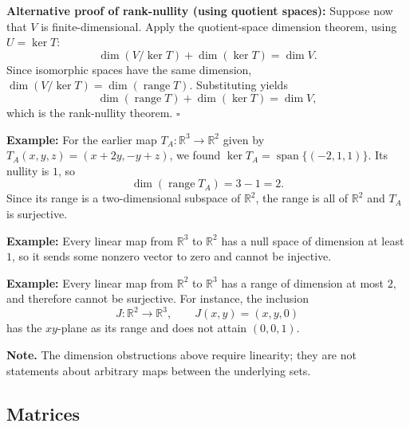 \documentclass[a4paper,11pt,abstract=true]{scrartcl}
\theoremstyle{dotlessP}
\theoremstyle{dotlessS}
\theoremstyle{remark}
\theoremstyle{definition}
\begin{document}
\begin{claim_box}
\textbf{Alternative proof of rank-nullity (using quotient spaces):}
Suppose now that $V$ is finite-dimensional. Apply the quotient-space
dimension theorem, using $U=\ker T$:
\[
\dim(V/\ker T)+\dim(\ker T)=\dim V.
\]
Since isomorphic spaces have the same dimension,
$\dim(V/\ker T)=\dim(\operatorname{range}T)$. Substituting yields
\[
\dim(\operatorname{range}T)+\dim(\ker T)=\dim V,
\]
which is the rank-nullity theorem. \hfill$\square$
\end{claim_box}

\begin{example_box}
\textbf{Example:} For the earlier map
$T_A:\mathbb{R}^3\longrightarrow\mathbb{R}^2$ given by
$T_A(x,y,z)=(x+2y,-y+z)$, we found
$\ker T_A=\operatorname{span}\{(-2,1,1)\}$. Its nullity is $1$, so
\[
\dim(\operatorname{range}T_A)=3-1=2.
\]
Since its range is a two-dimensional subspace of $\mathbb{R}^2$, the
range is all of $\mathbb{R}^2$ and $T_A$ is surjective.
\end{example_box}

\begin{example_box}
\textbf{Example:} Every linear map from $\mathbb{R}^3$ to
$\mathbb{R}^2$ has a null space of dimension at least $1$, so it sends
some nonzero vector to zero and cannot be injective.
\end{example_box}

\begin{example_box}
\textbf{Example:} Every linear map from $\mathbb{R}^2$ to
$\mathbb{R}^3$ has a range of dimension at most $2$, and therefore cannot
be surjective. For instance, the inclusion
\[
J:\mathbb{R}^2\longrightarrow\mathbb{R}^3,
\qquad J(x,y)=(x,y,0)
\]
has the $xy$-plane as its range and does not attain $(0,0,1)$.
\end{example_box}

\begin{remark_box}
\textbf{Note.} The dimension obstructions above require linearity;
they are not statements about arbitrary maps between the underlying
sets.
\end{remark_box}

\subsection{Matrices}
\end{document}
